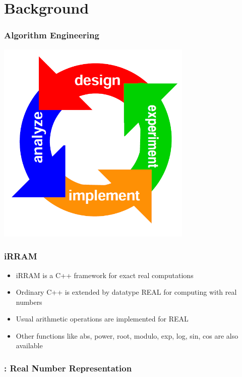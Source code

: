 \section{Background}
\begin{frame}
	\frametitle{Algorithm Engineering}
	\centering
	\includegraphics[width=0.7\textwidth]{approach.png}
\end{frame}
\begin{frame}[<+->]
\frametitle{iRRAM}
\begin{itemize}[<+->]
\item iRRAM is a C++ framework for exact real computations
\item Ordinary C++ is extended by datatype REAL for computing with real numbers
\item Usual arithmetic operations are implemented for REAL
\item Other functions like abs, power, root, modulo, exp, log, sin, cos are also available
\end{itemize}
\end{frame}
\begin{frame}
  \frametitle{\irram: Real Number Representation}
  \centering
\end{frame}

